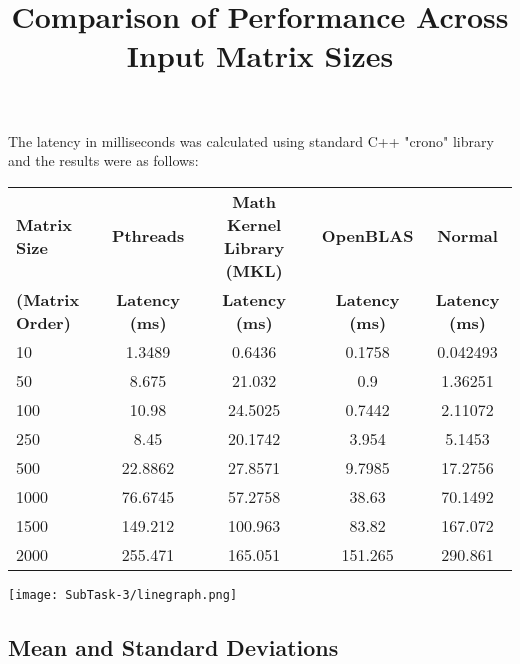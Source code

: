 \documentclass[10pt,a4paper,titlepage]{article}
\begin{document}
The latency in milliseconds was calculated using standard C++ "crono" library and the results were as follows:

\newpage


\begin{center}
\title{\begin{Large}
Comparison of Performance Across Input Matrix Sizes
\end{Large}}
\newline
\newline

\begin{tabular}{l|c|c|c|c}
\textbf{Matrix Size} & \textbf{Pthreads} & \textbf{Math Kernel Library (MKL)} &  \textbf{OpenBLAS} &  \textbf{Normal}\\
\textbf{(Matrix Order)} & \textbf{Latency (ms)} & \textbf{Latency (ms)} & \textbf{Latency (ms)} & \textbf{Latency (ms)}\\
\hline
10 & 1.3489 & 0.6436 & 0.1758 & 0.042493\\
50 & 8.675 & 21.032 & 0.9 & 1.36251\\
100 & 10.98 & 24.5025 & 0.7442 & 2.11072\\
250 & 8.45 & 20.1742 & 3.954 & 5.1453\\
500 & 22.8862 & 27.8571 & 9.7985 & 17.2756\\
1000 & 76.6745 & 57.2758 & 38.63 & 70.1492\\
1500 & 149.212 & 100.963 & 83.82 & 167.072\\
2000 & 255.471 & 165.051 & 151.265 & 290.861\\
\end{tabular}

\texttt{[image: SubTask-3/linegraph.png]} 
\newline
\newline
\end{center}

\subsection{Mean and Standard Deviations}
\end{document}
